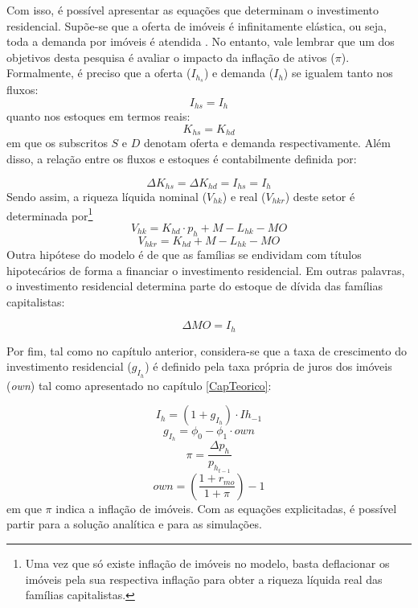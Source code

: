 Com isso, é possível apresentar as equações que determinam o investimento residencial. Supõe-se que a oferta de imóveis é infinitamente elástica, ou seja, toda a demanda por imóveis é atendida \cite[p.~141--145]{duesenberry_investment_1958}. No entanto, vale lembrar que um dos objetivos desta pesquisa é avaliar o impacto da inflação de ativos ($\pi$). Formalmente, é preciso que a oferta ($I_{h_s}$) e demanda ($I_h$) se igualem tanto nos fluxos:
\begin{equation}
    I_{hs} = I_h
\end{equation}
quanto nos estoques em termos reais:
\begin{equation}
    K_{hs} = K_{hd}
\end{equation}
em que os subscritos $S$ e $D$ denotam oferta e demanda respectivamente. Além disso, a relação entre os fluxos e estoques é contabilmente definida por:

\begin{equation}
    \Delta K_{hs} = \Delta K_{hd} = I_{hs} = I_h
\end{equation}
Sendo assim, a riqueza líquida nominal ($V_{hk}$) e real ($V_{hkr}$) deste setor é determinada por\footnote{
	Uma vez que só existe inflação de imóveis no modelo, basta deflacionar os imóveis pela sua respectiva inflação para obter a riqueza líquida real das famílias capitalistas.
}
\begin{equation}
V_{hk} = K_{hd}\cdot p_h + M - L_{hk} - MO
\end{equation}
\begin{equation}
V_{hkr} = K_{hd} + M - L_{hk} - MO
\end{equation}
Outra hipótese do modelo é de que as famílias se endividam com títulos hipotecários de forma a financiar o investimento residencial. Em outras palavras, o investimento residencial determina parte do estoque de dívida das famílias capitalistas:

\begin{equation}
    \label{EqMO}
    \Delta MO = I_h
\end{equation}

Por fim, tal como no capítulo anterior, considera-se que a taxa de crescimento do investimento residencial ($g_{I_h}$) é definido pela taxa própria de juros dos imóveis (\textit{own}) tal como apresentado no capítulo \ref{CapTeorico}:

\begin{equation}
    I_h = (1 + g_{I_h})\cdot Ih_{-1}
\end{equation}
\begin{equation}
\label{g_Z_own}
g_{I_h} = \phi_0 - \phi_1\cdot own
\end{equation}
$$
\pi = \frac{\Delta p_h}{p_{h_{t-1}}}
$$
\begin{equation}
own = \left(\frac{1+r_{mo}}{1+\pi}\right) -1
\end{equation}
em que $\pi$ indica a inflação de imóveis. 
Com as equações explicitadas, é possível partir para a solução analítica e para as simulações. 